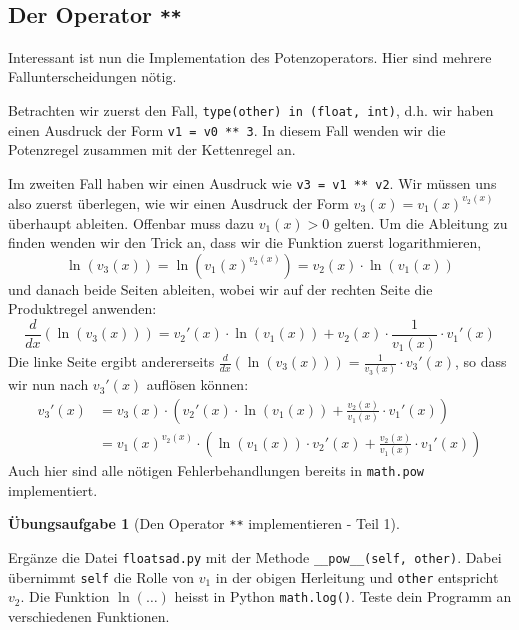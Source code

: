 \documentclass[
  letterpaper,
  DIV=11,
  oneside]{scrreprt}
\theoremstyle{definition}
\newtheorem{exercise}{Übungsaufgabe}[chapter]
\theoremstyle{definition}
\theoremstyle{remark}
\begin{document}
\hypertarget{der-operator}{%
\subsection{\texorpdfstring{Der Operator
\texttt{**}}{Der Operator **}}\label{der-operator}}

Interessant ist nun die Implementation des Potenzoperators. Hier sind
mehrere Fallunterscheidungen nötig.

Betrachten wir zuerst den Fall, \texttt{type(other)\ in\ (float,\ int)},
d.h. wir haben einen Ausdruck der Form \texttt{v1\ =\ v0\ **\ 3}. In
diesem Fall wenden wir die Potenzregel zusammen mit der Kettenregel an.

Im zweiten Fall haben wir einen Ausdruck wie \texttt{v3\ =\ v1\ **\ v2}.
Wir müssen uns also zuerst überlegen, wie wir einen Ausdruck der Form
\(v_3 (x) = v_1(x) ^{v_2 (x)}\) überhaupt ableiten. Offenbar muss dazu
\(v_1(x) > 0\) gelten. Um die Ableitung zu finden wenden wir den Trick
an, dass wir die Funktion zuerst logarithmieren, \[
\ln(v_3(x)) = \ln(v_1(x) ^{v_2 (x)}) = v_2(x) \cdot \ln(v_1(x))
\] und danach beide Seiten ableiten, wobei wir auf der rechten Seite die
Produktregel anwenden: \[
\frac{d}{dx}(\ln(v_3(x))) = v_2'(x) \cdot \ln(v_1(x)) + v_2(x) \cdot \frac{1}{v_1(x)} \cdot v_1'(x)
\] Die linke Seite ergibt andererseits
\(\frac{d}{dx}(\ln(v_3(x))) = \frac{1}{v_3(x)}\cdot v_3'(x)\), so dass
wir nun nach \(v_3'(x)\) auflösen können: \[
\begin{align}
    v_3'(x) &= v_3(x) \cdot \left( v_2'(x) \cdot \ln(v_1(x)) + \frac{v_2(x)}{v_1(x)} \cdot v_1'(x) \right) \\ 
    &= v_1(x) ^{v_2 (x)} \cdot \left( \ln(v_1(x)) \cdot v_2'(x) + \frac{v_2(x)}{v_1(x)} \cdot v_1'(x) \right)
\end{align}
\] Auch hier sind alle nötigen Fehlerbehandlungen bereits in
\texttt{math.pow} implementiert.

\leavevmode{}%
\begin{exercise}[Den Operator \texttt{**} implementieren - Teil
1]\label{exr-ImplementPow}

Ergänze die Datei \texttt{floatsad.py} mit der Methode
\texttt{\_\_pow\_\_(self,\ other)}. Dabei übernimmt \texttt{self} die
Rolle von \(v_1\) in der obigen Herleitung und \texttt{other} entspricht
\(v_2\). Die Funktion \(\ln(\ldots)\) heisst in Python
\texttt{math.log()}. Teste dein Programm an verschiedenen Funktionen.

\end{exercise}
\end{document}
